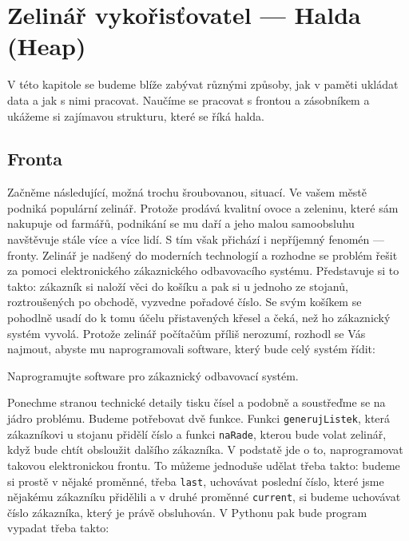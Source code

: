 \ifx\ucebnice\undefined

\setcounter{section}{1}
\fi
\section{Zelinář vykořisťovatel --- Halda (Heap)}

V této kapitole se budeme blíže zabývat různými způsoby, jak v paměti ukládat data a jak s nimi pracovat. Naučíme se
pracovat s frontou a zásobníkem a ukážeme si zajímavou strukturu, které se říká halda. 

\subsection*{Fronta} 

Začněme následující, možná trochu šroubovanou, situací. Ve vašem městě podniká populární zelinář. Protože prodává kvalitní ovoce a zeleninu, 
které sám nakupuje od farmářů, podnikání se mu daří a jeho malou samoobsluhu navštěvuje stále více a více lidí. S tím však 
přichází i nepříjemný fenomén --- fronty. Zelinář je nadšený do moderních technologií a rozhodne se problém řešit za pomoci
elektronického zákaznického odbavovacího systému. Představuje si to takto: zákazník si naloží věci do košíku a pak si u jednoho ze stojanů,
roztroušených po obchodě, vyzvedne pořadové číslo. Se svým košíkem se pohodlně usadí do k tomu účelu přistavených
křesel a čeká, než ho zákaznický systém vyvolá. Protože zelinář počítačům příliš nerozumí, rozhodl se Vás najmout, abyste
mu naprogramovali software, který bude celý systém řídit:

\begin{question} Naprogramujte software pro zákaznický odbavovací systém.
\end{question}

Ponechme stranou technické detaily tisku čísel a podobně a soustřeďme se na jádro problému. Budeme potřebovat dvě funkce. Funkci
{\tt generujListek}, která zákazníkovi u stojanu přidělí číslo a funkci {\tt naRade}, kterou bude volat zelinář, když bude chtít
obsloužit dalšího zákazníka. V podstatě jde o to, naprogramovat takovou elektronickou frontu. To můžeme jednoduše udělat třeba
takto: budeme si prostě v nějaké proměnné, třeba {\tt last},  uchovávat poslední číslo, které jsme nějakému zákazníku přidělili a v druhé
proměnné {\tt current}, si budeme uchovávat číslo zákazníka, který je právě obsluhován. V Pythonu pak bude program vypadat třeba
takto:

